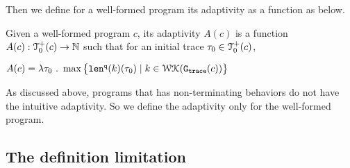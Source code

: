 Then we define for a well-formed program its adaptivity as a function as below.
\begin{defn}
    \label{def:trace_adapt}
    Given a well-formed program ${c}$, 
    its adaptivity $A(c)$ is a function 
    $A(c) : \mathcal{T}^{+}_0(c)\to \mathbb{N}$ such that for an
    initial trace $\mathtt{\tau}_0 \in \mathcal{T}^{+}_0(c)$, 
\begin{center}
$
    A(c) = \lambda \mathtt{\tau}_0 ~.~ \max \big 
    \{ \mathtt{len}^{\tt q}(k)(\mathtt{\tau}_0) \mid k \in \mathcal{WK}(\mathtt{{G_{trace}}}(c)) \big \} 
$
\end{center}
\end{defn}
As discussed above, programs that has non-terminating behaviors do not have the intuitive adaptivity. So we define the adaptivity only for the well-formed program.

\subsection{The definition limitation}
